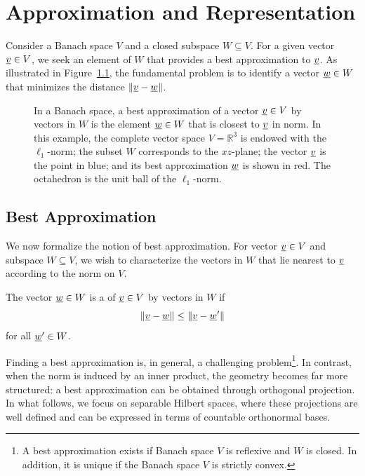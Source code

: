 \chapter{Approximation and Representation}

Consider a Banach space $V$ and a closed subspace $W \subseteq V$.
For a given vector $\underline{v} \in V$, we seek an element of $W$ that provides a best approximation to $\underline{v}$.
As illustrated in Figure~\ref{fig:AR-Banach1}, the fundamental problem is to identify a vector $\underline{w} \in W$ that minimizes the distance $\| \underline{v} - \underline{w} \|$.

\begin{figure}[hbt]
\centering{}
\caption{In a Banach space, a best approximation  of a vector $\underline{v} \in V$ by vectors in $W$ is the element $\underline{w} \in W$ that is closest to $\underline{v}$ in norm.
In this example, the complete vector space $V=\mathbb{R}^3$ is endowed with the $\ell_1$-norm; the subset $W$ corresponds to the $xz$-plane; the vector $\underline{v}$ is the point in blue; and its best approximation $\underline{w}$ is shown in red.
The octahedron is the unit ball of the $\ell_1$-norm.}
\label{fig:AR-Banach1}
\end{figure}


\section{Best Approximation}

We now formalize the notion of best approximation.
For vector $\underline{v} \in V$ and subspace $W \subseteq V$, we wish to characterize the vectors in $W$ that lie nearest to $\underline{v}$ according to the norm on $V$.

\begin{definition}
The vector $\underline{w} \in W$ is a  of $\underline{v} \in V$ by vectors in $W$ if
\begin{equation*}
\left\| \underline{v} - \underline{w} \right\| \leq \left\| \underline{v} - \underline{w}' \right\|
\end{equation*}
for all $\underline{w}' \in W$.
\end{definition}

Finding a best approximation is, in general, a challenging problem\footnote{A best approximation exists if Banach space $V$ is reflexive and $W$ is closed. In addition, it is unique if the Banach space $V$ is strictly convex.}.
In contrast, when the norm is induced by an inner product, the geometry becomes far more structured: a best approximation can be obtained through orthogonal projection.
In what follows, we focus on separable Hilbert spaces, where these projections are well defined and can be expressed in terms of countable orthonormal bases.

